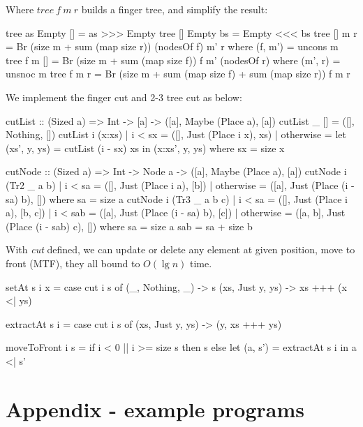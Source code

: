 \documentclass[b5paper]{article}
\begin{document}
\begin{Answer}[ref = {ex:finger-tree-index}]
{Where $tree\ f\ m\ r$ builds a finger tree, and simplify the result:

\begin{Haskell}
tree as Empty [] = as >>> Empty
tree [] Empty bs = Empty <<< bs
tree [] m r = Br (size m + sum (map size r)) (nodesOf f) m' r
    where (f, m') = uncons m
tree f m [] = Br (size m + sum (map size f)) f m' (nodesOf r)
    where (m', r) = unsnoc m
tree f m r = Br (size m + sum (map size f) + sum (map size r)) f m r
\end{Haskell}

We implement the finger cut and 2-3 tree cut as below:

\begin{Haskell}
cutList :: (Sized a) => Int -> [a] -> ([a], Maybe (Place a), [a])
cutList _ [] = ([], Nothing, [])
cutList i (x:xs) | i < sx = ([], Just (Place i x), xs)
                 | otherwise = let (xs', y, ys) = cutList (i - sx) xs
                               in (x:xs', y, ys)
  where sx = size x

cutNode :: (Sized a) => Int -> Node a -> ([a], Maybe (Place a), [a])
cutNode i (Tr2 _ a b) | i < sa = ([], Just (Place i a), [b])
                      | otherwise = ([a], Just (Place (i - sa) b), [])
  where sa = size a
cutNode i (Tr3 _ a b c) | i < sa = ([], Just (Place i a), [b, c])
                        | i < sab = ([a], Just (Place (i - sa) b), [c])
                        | otherwise = ([a, b], Just (Place (i - sab) c), [])
  where sa = size a
        sab = sa + size b
\end{Haskell}

With \textit{cut} defined, we can update or delete any element at given position, move to front (MTF), they all bound to $O(\lg n)$ time.

\begin{Haskell}
setAt s i x = case cut i s of
  (_, Nothing, _) -> s
  (xs, Just y, ys) -> xs +++ (x <| ys)

extractAt s i = case cut i s of (xs, Just y, ys) -> (y, xs +++ ys)

moveToFront i s = if i < 0 || i >= size s then s
                  else let (a, s') = extractAt s i in a <| s'
\end{Haskell}
}
\end{Answer}

\section{Appendix - example programs}
\end{document}
